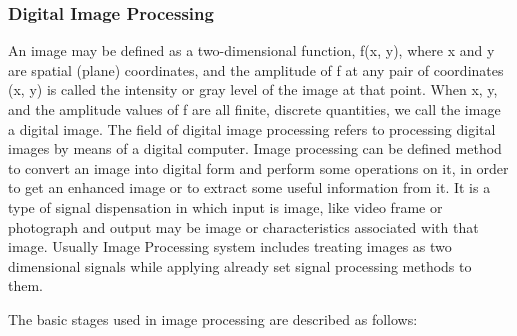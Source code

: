 \documentclass[12pt, a4paper]{article}
\begin{document}
\subsubsection{Digital Image Processing}
An image may be defined as a two-dimensional function, f(x, y), where x and y are spatial (plane) coordinates, and the amplitude of f at any pair of coordinates (x, y) is called the intensity or gray level of the image at that point. When x, y, and the amplitude values of f are all finite, discrete quantities, we call the image a digital image. The field of digital image processing refers to processing digital images by means of a digital computer.
Image processing can be defined method to convert an image into digital form and perform some operations on it, in order to get an enhanced image or to extract some useful information from it. It is a type of signal dispensation in which input is image, like video frame or photograph and output may be image or characteristics associated with that image. Usually Image Processing system includes treating images as two dimensional signals while applying already set signal processing methods to them.~\cite{raf}

The basic stages used in image processing are described as follows:
\end{document}
